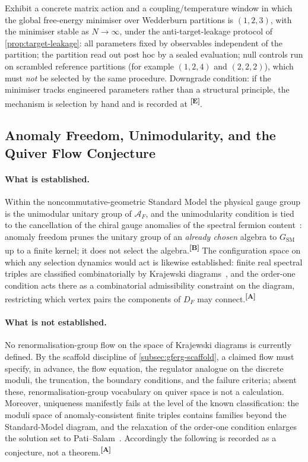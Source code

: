 \documentclass[12pt,a4paper,twoside]{article}
\theoremstyle{plain}
\theoremstyle{definition}
\theoremstyle{remark}
\newcommand{\catmark}[1]{\textsuperscript{\textsf{\textbf{[#1]}}}}
\begin{document}
\begin{governancebox}[Programme Requirement PR-B1: Partition Selection \catmark{D}]
Exhibit a concrete matrix action and a coupling/temperature window in
which the global free-energy minimiser over Wedderburn partitions is
$(1,2,3)$, with the minimiser stable as $N\to\infty$, under the
anti-target-leakage protocol of \cref{prop:target-leakage}: all parameters
fixed by observables independent of the partition; the partition read out
post hoc by a sealed evaluation; null controls run on scrambled reference
partitions (for example $(1,2,4)$ and $(2,2,2)$), which must \emph{not} be
selected by the same procedure. Downgrade condition: if the minimiser
tracks engineered parameters rather than a structural principle, the
mechanism is selection by hand and is recorded at \catmark{E}.
\end{governancebox}

\subsection{Anomaly Freedom, Unimodularity, and the Quiver Flow Conjecture}
\label{app:b-anomaly}

\paragraph{What is established.}
Within the noncommutative-geometric Standard Model the physical gauge
group is the unimodular unitary group of $\mathcal{A}_F$, and the
unimodularity condition is tied to the cancellation of the chiral gauge
anomalies of the spectral fermion content~\cite{agbm1995,cc2008}: anomaly
freedom prunes the unitary group of an \emph{already chosen} algebra to
$G_{\mathrm{SM}}$ up to a finite kernel; it does not select the
algebra.\catmark{B} The configuration space on which any selection
dynamics would act is likewise established: finite real spectral triples
are classified combinatorially by Krajewski
diagrams~\cite{krajewski1998,paschkesitarz1998}, and the order-one
condition acts there as a combinatorial admissibility constraint on the
diagram, restricting which vertex pairs the components of $D_F$ may
connect.\catmark{A}

\paragraph{What is not established.}
No renormalisation-group flow on the space of Krajewski diagrams is
currently defined. By the scaffold discipline of
\cref{subsec:gferg-scaffold}, a claimed flow must specify, in advance, the
flow equation, the regulator analogue on the discrete moduli, the
truncation, the boundary conditions, and the failure criteria; absent
these, renormalisation-group vocabulary on quiver space is not a
calculation. Moreover, uniqueness manifestly fails at the level of the
known classification: the moduli space of anomaly-consistent finite
triples contains families beyond the Standard-Model diagram, and the
relaxation of the order-one condition enlarges the solution set to
Pati--Salam~\cite{ccvs2013,farnsworth2015}. Accordingly the following is
recorded as a conjecture, not a theorem.\catmark{A}
\end{document}
